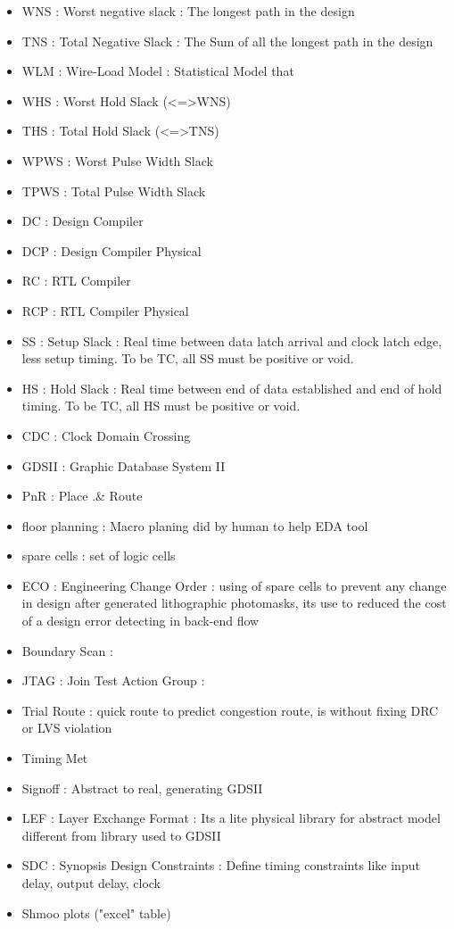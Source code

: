 \documentclass[11pt,a4paper,sans,dvipsnames]{report}
\begin{document}
\begin{itemize}
		\item WNS : Worst negative slack : The longest path in the design
		\item TNS : Total Negative Slack : The Sum of all the longest path in the design
		\item WLM : Wire-Load Model : Statistical Model that \item WHS : Worst Hold Slack (<=>WNS)
		\item THS : Total Hold Slack (<=>TNS)
		\item WPWS : Worst Pulse Width Slack
		\item TPWS : Total Pulse Width Slack
		\item DC : Design Compiler
		\item DCP : Design Compiler Physical
		\item RC : RTL Compiler
		\item RCP : RTL Compiler Physical
		\item SS : Setup Slack : Real time between data latch arrival and clock latch edge, less setup timing. To be TC, all SS must be positive or void.
		\item HS : Hold Slack : Real time between end of data established and end of hold timing. To be TC, all HS must be positive or void.
		\item CDC : Clock Domain Crossing
		\item GDSII : Graphic Database System II
		\item PnR : Place .\& Route

		\item floor planning : Macro planing did by human to help EDA tool
		\item spare cells : set of logic cells 
		\item ECO : Engineering Change Order : using of spare cells to prevent any change in design after generated lithographic photomasks, its use to reduced the cost of a design error detecting in back-end flow 
		\item Boundary Scan : 
		\item JTAG : Join Test Action Group :
		\item Trial Route : quick route to predict congestion route, is without fixing DRC or LVS violation
		\item Timing Met
		\item Signoff : Abstract to real, generating GDSII

		\item LEF : Layer Exchange Format : Its a lite physical library for abstract model different from library used to GDSII
		\item SDC : Synopsis Design Constraints : Define timing constraints like input delay, output delay, clock
		\item Shmoo plots ("excel" table)

	\end{itemize}
\end{document}
